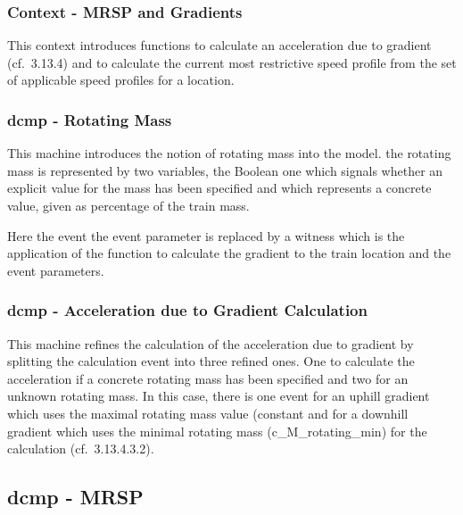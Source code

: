\documentclass{template/openetcs_article}
\begin{document}
\subsubsection{Context - MRSP and Gradients}
\label{sec:cont-mrsp-grad}

This context introduces functions to calculate an acceleration due to gradient
(cf.~3.13.4) and to calculate the current most restrictive speed profile from
the set of applicable speed profiles for a location.




\subsubsection{dcmp - Rotating Mass}
\label{sec:dcmp-rotating-mass}

This machine introduces the notion of rotating mass into the model. the rotating
mass is represented by two variables, the Boolean one
 which signals whether an explicit value for the
mass has been specified and  which represents a concrete
value, given as percentage of the train mass.

Here the event  the event parameter
 is replaced by a witness which is the application of the
function to calculate the gradient to the train location and the event
parameters.

{\footnotesize  }

\subsubsection{dcmp - Acceleration due to Gradient Calculation}
\label{sec:dcmp-accel-due}

This machine refines the calculation of the acceleration due to gradient by
splitting the calculation event into three refined ones. One to calculate the
acceleration if a concrete rotating mass has been specified and two for an
unknown rotating mass. In this case, there is one event for an uphill gradient
which uses the maximal rotating mass value (constant
 and for a downhill gradient which uses the minimal
rotating mass (c\_M\_rotating\_min) for the calculation (cf.~3.13.4.3.2).

{\footnotesize

}

\subsection{dcmp - MRSP}
\label{sec:dcmp-mrsp}
\end{document}
